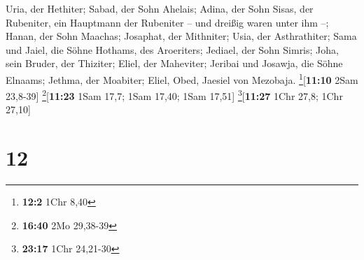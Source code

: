  Uria, der Hethiter; Sabad, der Sohn Ahelais;
 Adina, der Sohn Sisas, der Rubeniter, ein Hauptmann der
Rubeniter -- und dreißig waren unter ihm --;  Hanan, der
Sohn Maachas; Josaphat, der Mithniter;  Usia, der
Asthrathiter; Sama und Jaiel, die Söhne Hothams, des Aroeriters;
 Jediael, der Sohn Simris; Joha, sein Bruder, der
Thiziter;  Eliel, der Maheviter; Jeribai und Josawja, die
Söhne Elnaams; Jethma, der Moabiter;  Eliel, Obed,
Jaesiel von Mezobaja. \footnote{\textbf{12:2} 1Chr 8,40}{[}\textbf{11:10}
2Sam 23,8-39{]} \footnote{\textbf{16:40} 2Mo 29,38-39}{[}\textbf{11:23}
1Sam 17,7; 1Sam 17,40; 1Sam 17,51{]} \footnote{\textbf{23:17} 1Chr
  24,21-30}{[}\textbf{11:27} 1Chr 27,8; 1Chr 27,10{]}

\hypertarget{section-11}{%
\section{12}\label{section-11}}

